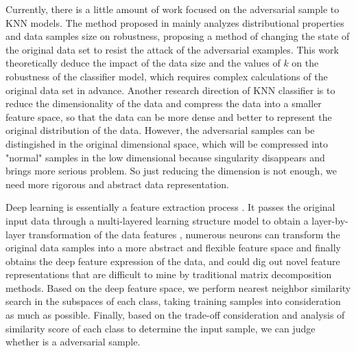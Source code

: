 \documentclass{ieeeaccess}
\begin{document}
Currently, there is a little amount of work focused on the adversarial sample to KNN models. The method proposed in\cite{wang2017analyzing} mainly analyzes distributional properties and data samples size on robustness, proposing a method of changing the state of the original data set to resist the attack of the adversarial examples. This work theoretically deduce the impact of the data size and the values of $k$ on the robustness of the classifier model, which requires complex calculations of the original data set in advance.
Another research direction of KNN classifier is to reduce the dimensionality of the data and compress the data into a smaller feature space\cite{lin2011parameter}, so that the data can be more dense and better to represent the original distribution of the data. However, the adversarial samples can be distingished in the original dimensional space, which will be compressed into "normal" samples in the low dimensional because singularity disappears and brings more serious problem. 
So just reducing the dimension is not enough, we need more rigorous and abstract data representation. 

Deep learning is essentially a feature extraction process \cite{gordo2016deep}. It passes the original input data through a multi-layered learning structure model to obtain a layer-by-layer transformation of the data features , numerous neurons can transform the original data samples into a more abstract and flexible feature space and finally obtains the deep feature expression of the data, and could dig out novel feature representations that are difficult to mine by traditional matrix decomposition methods.
Based on the deep feature space, we perform nearest neighbor similarity search in the subspaces of each class, taking training samples into consideration as much as possible.  Finally, based on the trade-off consideration and analysis of similarity score of each class to determine the input sample, we can judge whether is a adversarial sample. 

\end{document}
